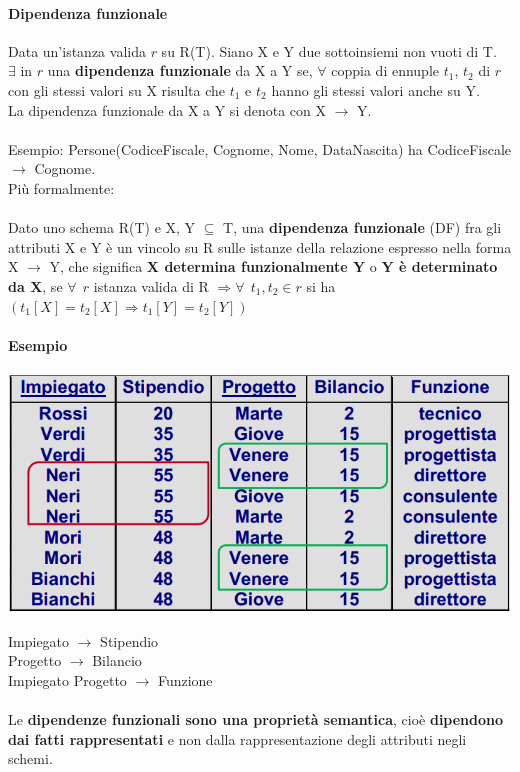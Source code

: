 \documentclass[10pt]{book}
\begin{document}
\paragraph{Dipendenza funzionale} Data un'istanza valida $r$ su R(T). Siano X e Y due sottoinsiemi non vuoti di T.\\
$\exists$ in $r$ una \textbf{dipendenza funzionale} da X a Y se, $\forall$ coppia di ennuple $t_1$, $t_2$ di $r$ con gli stessi valori su X risulta che $t_1$ e $t_2$ hanno gli stessi valori anche su Y.\\
La dipendenza funzionale da X a Y si denota con X $\rightarrow$ Y.\\\\
Esempio: Persone(CodiceFiscale, Cognome, Nome, DataNascita) ha CodiceFiscale $\rightarrow$ Cognome.\\
Più formalmente:\\\\
Dato uno schema R(T) e X, Y $\subseteq$ T, una \textbf{dipendenza funzionale} (DF) fra gli attributi X e Y è un vincolo su R sulle istanze della relazione espresso nella forma X $\rightarrow$ Y, che significa \textbf{X determina funzionalmente Y} o \textbf{Y è determinato da X}, se $\forall\:\:r$ istanza valida di R $\Rightarrow \forall\:\:t_1,t_2\in r$ si ha $(t_1[X] = t_2[X] \Rightarrow t_1[Y] = t_2[Y])$
\paragraph{Esempio}
\begin{center}
	\includegraphics[scale=0.5]{ridondanze.png}
\end{center}
Impiegato $\rightarrow$ Stipendio\\
Progetto $\rightarrow$ Bilancio\\
Impiegato Progetto $\rightarrow$ Funzione\\\\
Le \textbf{dipendenze funzionali sono una proprietà semantica}, cioè \textbf{dipendono dai fatti rappresentati} e non dalla rappresentazione degli attributi negli schemi.
\end{document}
